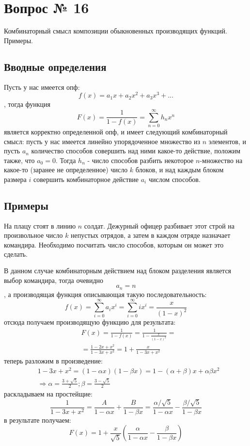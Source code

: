 \chapter{Вопрос № 16}

Комбинаторный смысл композиции обыкновенных производящих функций. Примеры.

\section{Вводные определения}

Пусть у нас имеется опф:
\[
	f\left(x\right) = a_1x + a_2x^2 + a_3x^3 + ...
\]
, тогда функция
\[
	F\left(x\right) = \frac{1}{1-f\left(x\right)} = \sum_{n=0}^\infty h_n x^n
\]
является корректно определенной опф, и имеет следующий комбинаторный смысл: пусть у нас имеется линейно упорядоченное множество из $n$ элементов, и пусть $a_n$ количество способов совершить над ними какое-то действие, положим также, что $a_0 = 0$. Тогда $h_n$ - число способов разбить некоторое $n$-множество на какое-то (заранее не определенное) число $k$ блоков, и над каждым блоком размера $i$ совершить комбинаторное действие $a_i$ числом способов.

\section{Примеры}

На плацу стоят в линию $n$ солдат. Дежурный офицер разбивает этот строй на произвольное число $k$ непустых отрядов, а затем в каждом отряде назначает командира. Необходимо посчитать число способов, которым он может это сделать.

В данном случае комбинаторным действием над блоком разделения является выбор командира, тогда очевидно $$ a_n = n $$, а производящая функция описывающая такую последовательность:
\[
	f\left(x\right) = \sum_{i=0}^\infty a_i x^i = \sum_{i=0}^\infty ix^i = \frac{x}{\left(1-x\right)^2}
\]
отсюда получаем производящую функцию для результата:
\[
	\begin{split}
		&F\left(x\right) = \frac{1}{1-f\left(x\right)} = \frac{1}{1 - \frac{x}{\left(1-x\right)^2}} = \\
		& = \frac{1-2x+x^2}{1-3x+x^2} = 1 + \frac{x}{1-3x+x^2}
	\end{split}
\]
теперь разложим в произведение:
\[
	\begin{split}
		&1-3x+x^2 = \left(1-\alpha x\right)\left(1-\beta x\right) = 1 - \left(\alpha+\beta\right)x + \alpha \beta x^2\\
		& \Rightarrow \alpha = \frac{3+\sqrt{5}}{2}; \beta = \frac{3-\sqrt{5}}{2}
	\end{split}
\]
раскладываем на простейщие:
\[
	\frac{1}{1-3x+x^2} = \frac{A}{1-\alpha x} + \frac{B}{1 - \beta x} = \frac{\alpha / \sqrt{5}}{1-\alpha x} - \frac{\beta / \sqrt{5}}{1 - \beta x}
\]
в результате получаем:
\[
	F\left(x\right) = 1 + \frac{x}{\sqrt{5}} \left(\frac{\alpha}{1-\alpha x} - \frac{\beta}{1-\beta x}\right)
\]

